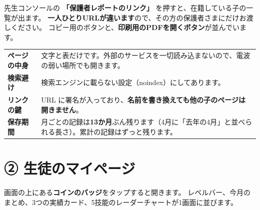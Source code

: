 \documentclass[a4paper,10.5pt]{article}
\newcommand{\hl}[1]{\textbf{\color{uspeakGreen}#1}}
\begin{document}
先生コンソールの \hl{「保護者レポートのリンク」} を押すと、在籍している子の一覧が出ます。
\hl{一人ひとりURLが違います}ので、その方の保護者さまにだけお渡しください。
コピー用のボタンと、\hl{印刷用のPDFを開くボタン}が並んでいます。

\begin{center}
\begin{tabular}{@{}p{}p{}@{}}
\toprule
\hl{ページの中身} & 文字と表だけです。外部のサービスを一切読み込まないので、電波の弱い場所でも開きます。\\
\hl{検索避け} & 検索エンジンに載らない設定（noindex）にしてあります。\\
\hl{リンクの鍵} & URL に署名が入っており、\textbf{名前を書き換えても他の子のページは開きません}。\\
\hl{保存期間} & 月ごとの記録は\textbf{13か月}ぶん残ります（4月に「去年の4月」と並べられる長さ）。累計の記録はずっと残ります。\\
\bottomrule
\end{tabular}
\end{center}

\Needspace{118mm}
\section{② 生徒のマイページ}

画面の上にある\hl{コインのバッジ}をタップすると開きます。
レベルバー、今月のまとめ、3つの実績カード、5技能のレーダーチャートが1画面に並びます。
\end{document}
